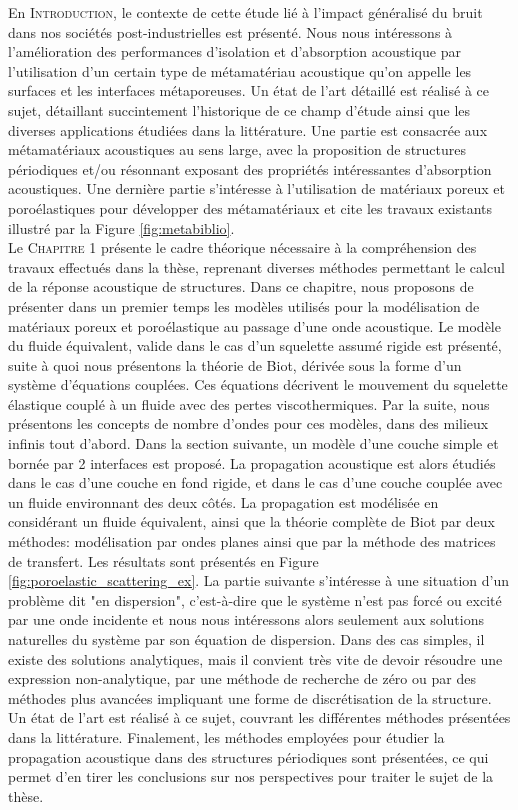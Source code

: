 En \textsc{Introduction}, le contexte de cette étude lié à l'impact généralisé du bruit dans nos sociétés post-industrielles est présenté. Nous nous intéressons à l'amélioration des performances d'isolation et d'absorption acoustique par l'utilisation d'un certain type de métamatériau acoustique qu'on appelle les surfaces et les interfaces métaporeuses. Un état de l'art détaillé est réalisé à ce sujet, détaillant succintement l'historique de ce champ d'étude ainsi que les diverses applications étudiées dans la littérature. Une partie est consacrée aux métamatériaux acoustiques au sens large, avec la proposition de structures périodiques et/ou résonnant exposant des propriétés intéressantes d'absorption acoustiques. Une dernière partie s'intéresse à l'utilisation de matériaux poreux et poroélastiques pour développer des métamatériaux et cite les travaux existants illustré par la Figure \ref{fig:metabiblio}.\\

Le \textsc{Chapitre 1} présente le cadre théorique nécessaire à la compréhension des travaux effectués dans la thèse, reprenant diverses méthodes permettant le calcul de la réponse acoustique de structures. Dans ce chapitre, nous proposons de présenter dans un premier temps les modèles utilisés pour la modélisation de matériaux poreux et poroélastique au passage d'une onde acoustique. Le modèle du fluide équivalent, valide dans le cas d'un squelette assumé rigide est présenté, suite à quoi nous présentons la théorie de Biot, dérivée sous la forme d'un système d'équations couplées. Ces équations décrivent le mouvement du squelette élastique couplé à un fluide avec des pertes viscothermiques. Par la suite, nous présentons les concepts de nombre d'ondes pour ces modèles, dans des milieux infinis tout d'abord. Dans la section suivante, un modèle d'une couche simple et bornée par 2 interfaces est proposé. La propagation acoustique est alors étudiés dans le cas d'une couche en fond rigide, et dans le cas d'une couche couplée avec un fluide environnant des deux côtés. La propagation est modélisée en considérant un fluide équivalent, ainsi que la théorie complète de Biot par deux méthodes: modélisation par ondes planes ainsi que par la méthode des matrices de transfert. Les résultats sont présentés en Figure \ref{fig:poroelastic_scattering_ex}. La partie suivante s'intéresse à une situation d'un problème dit "en dispersion", c'est-à-dire que le système n'est pas forcé ou excité par une onde incidente et nous nous intéressons alors seulement aux solutions naturelles du système par son équation de dispersion. Dans des cas simples, il existe des solutions analytiques, mais il convient très vite de devoir résoudre une expression non-analytique, par une méthode de recherche de zéro ou par des méthodes plus avancées impliquant une forme de discrétisation de la structure. Un état de l'art est réalisé à ce sujet, couvrant les différentes méthodes présentées dans la littérature. Finalement, les méthodes employées pour étudier la propagation acoustique dans des structures périodiques sont présentées, ce qui permet d'en tirer les conclusions sur nos perspectives pour traiter le sujet de la thèse. 

